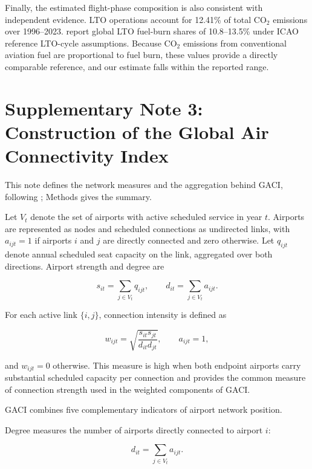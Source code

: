 \documentclass[12pt]{extarticle}
\begin{document}
Finally, the estimated flight-phase composition is also consistent with independent evidence. LTO operations account for 12.41\% of total CO$_2$ emissions over 1996--2023. \citet{quadros2022} report global LTO fuel-burn shares of 10.8--13.5\% under ICAO reference LTO-cycle assumptions. Because CO$_2$ emissions from conventional aviation fuel are proportional to fuel burn, these values provide a directly comparable reference, and our estimate falls within the reported range.

\clearpage
\section*{Supplementary Note 3: Construction of the Global Air Connectivity Index}
This note defines the network measures and the aggregation behind GACI, following \citet{cheung2020}; Methods gives the summary.

Let $V_t$ denote the set of airports with active scheduled service in year $t$. Airports are represented as nodes and scheduled connections as undirected links, with $a_{ijt}=1$ if airports $i$ and $j$ are directly connected and zero otherwise. Let $q_{ijt}$ denote annual scheduled seat capacity on the link, aggregated over both directions. Airport strength and degree are

\begin{equation}
s_{it}
=
\sum_{j\in V_t} q_{ijt},
\qquad
d_{it}
=
\sum_{j\in V_t} a_{ijt}.
\label{eq:nature_9}
\end{equation}

For each active link $\{i,j\}$, connection intensity is defined as

\begin{equation}
w_{ijt}
=
\sqrt{
\frac{s_{it}s_{jt}}
{d_{it}d_{jt}}
},
\qquad
a_{ijt}=1,
\label{eq:nature_10}
\end{equation}

and $w_{ijt}=0$ otherwise. This measure is high when both endpoint airports carry substantial scheduled capacity per connection and provides the common measure of connection strength used in the weighted components of GACI.

GACI combines five complementary indicators of airport network position.

Degree measures the number of airports directly connected to airport $i$:

\begin{equation}
d_{it}
=
\sum_{j\in V_t} a_{ijt}.
\label{eq:nature_11}
\end{equation}
\end{document}
